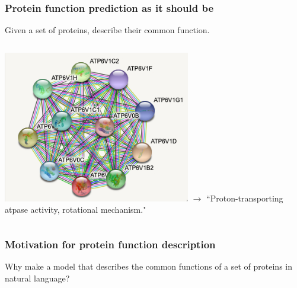 \documentclass{beamer}
\begin{document}
\begin{frame}
    \frametitle{Protein function prediction as it \textbf{should be}}
    Given a set of proteins, describe their common function.
    \bigskip
    \begin{columns}
     \includegraphics[height=0.4\textheight]{atpase_activity.png}
     \center $\rightarrow$
     ``Proton-transporting atpase activity, rotational mechanism."
    \end{columns}
\end{frame}

\begin{frame}
\frametitle{Motivation for protein function description}
    Why make a model that describes the common functions of a set of proteins in natural language?
\end{frame}
\end{document}
